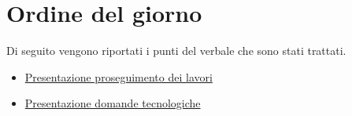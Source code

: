 \clearpage
\section{Ordine del giorno}
Di seguito vengono riportati i punti del verbale che sono stati trattati.
\begin{itemize}
	\item \hyperref[sec:presentazione_proseguimento_lavori]{Presentazione proseguimento dei lavori}
	\item \hyperref[sec:presentazione_domande_tecnologiche]{Presentazione domande tecnologiche}
\end{itemize}